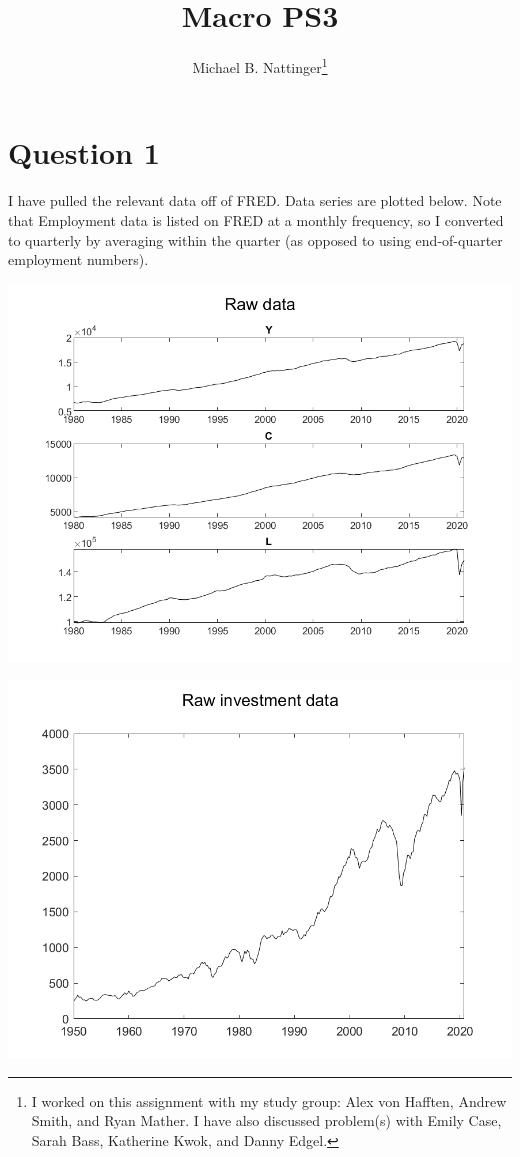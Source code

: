\documentclass[11pt]{article} %
\title{Macro PS3}
\author{Michael B. Nattinger\footnote{I worked on this assignment with my study group: Alex von Hafften, Andrew Smith, and Ryan Mather. I have also discussed problem(s) with Emily Case, Sarah Bass, Katherine Kwok, and Danny Edgel.}}
\begin{document}
\maketitle
\section{Question 1}
I have pulled the relevant data off of FRED. Data series are plotted below. Note that Employment data is listed on FRED at a monthly frequency, so I converted to quarterly by averaging within the quarter (as opposed to using end-of-quarter employment numbers).

\includegraphics{raw}

\includegraphics{rawi}
\end{document}
